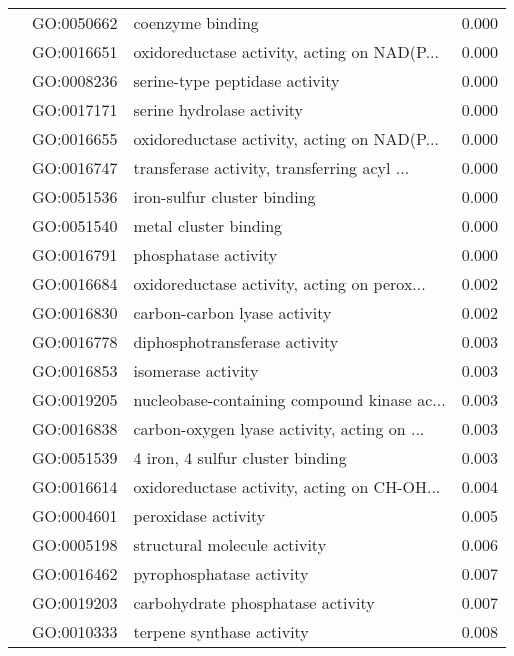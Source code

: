\begin{longtable}{lllr}
   & GO:0050662 &                             coenzyme binding &         0.000 \\
   & GO:0016651 &  oxidoreductase activity, acting on NAD(P... &         0.000 \\
   & GO:0008236 &               serine-type peptidase activity &         0.000 \\
   & GO:0017171 &                    serine hydrolase activity &         0.000 \\
   & GO:0016655 &  oxidoreductase activity, acting on NAD(P... &         0.000 \\
   & GO:0016747 &  transferase activity, transferring acyl ... &         0.000 \\
   & GO:0051536 &                  iron-sulfur cluster binding &         0.000 \\
   & GO:0051540 &                        metal cluster binding &         0.000 \\
   & GO:0016791 &                         phosphatase activity &         0.000 \\
   & GO:0016684 &  oxidoreductase activity, acting on perox... &         0.002 \\
   & GO:0016830 &                 carbon-carbon lyase activity &         0.002 \\
   & GO:0016778 &                diphosphotransferase activity &         0.003 \\
   & GO:0016853 &                           isomerase activity &         0.003 \\
   & GO:0019205 &  nucleobase-containing compound kinase ac... &         0.003 \\
   & GO:0016838 &  carbon-oxygen lyase activity, acting on ... &         0.003 \\
   & GO:0051539 &             4 iron, 4 sulfur cluster binding &         0.003 \\
   & GO:0016614 &  oxidoreductase activity, acting on CH-OH... &         0.004 \\
   & GO:0004601 &                          peroxidase activity &         0.005 \\
   & GO:0005198 &                 structural molecule activity &         0.006 \\
   & GO:0016462 &                     pyrophosphatase activity &         0.007 \\
   & GO:0019203 &            carbohydrate phosphatase activity &         0.007 \\
   & GO:0010333 &                    terpene synthase activity &         0.008 \\

\end{longtable}
